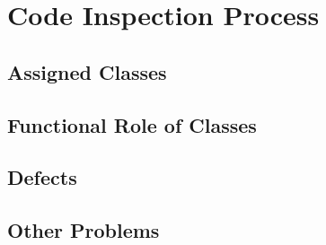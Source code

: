 \chapter{Code Inspection Process} \label{chap2}

\section{Assigned Classes}

\section{Functional Role of Classes}

\section{Defects}

\section{Other Problems}